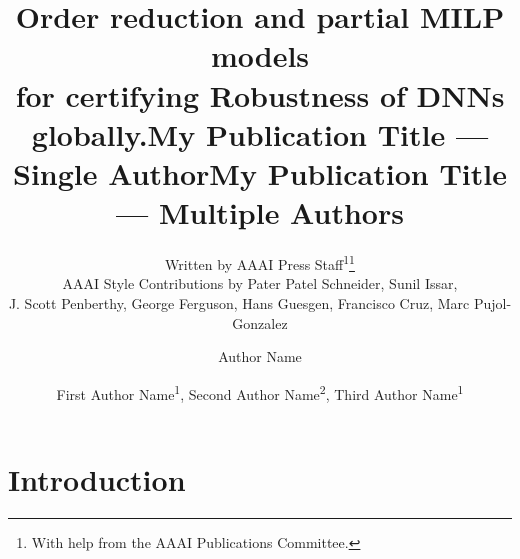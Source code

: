 \documentclass[letterpaper]{article} %
\title{Order reduction and partial MILP models \\
	for certifying Robustness of DNNs globally.}
\date{}
\author{
	Written by AAAI Press Staff\textsuperscript{\rm 1}\thanks{With help from the AAAI Publications Committee.}\\
	AAAI Style Contributions by Pater Patel Schneider,
	Sunil Issar,\\
	J. Scott Penberthy,
	George Ferguson,
	Hans Guesgen,
	Francisco Cruz\equalcontrib,
	Marc Pujol-Gonzalez\equalcontrib
}
\title{My Publication Title --- Single Author}
\author {
	Author Name
}
\title{My Publication Title --- Multiple Authors}
\author {
	First Author Name\textsuperscript{\rm 1},
	Second Author Name\textsuperscript{\rm 2},
	Third Author Name\textsuperscript{\rm 1}
}
\begin{document}
	
	\maketitle
	
	\begin{abstract}
		

	\end{abstract}
	
	
	\section{Introduction}
	
	
	
	
	
	
	
	
	
\end{document}
